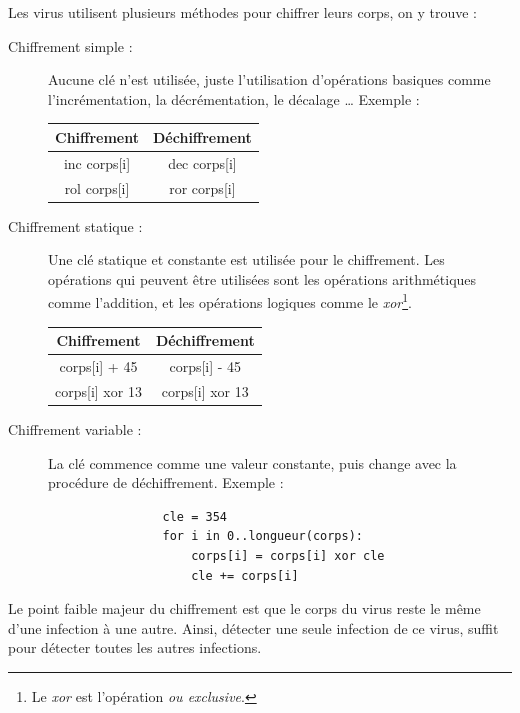     Les virus utilisent plusieurs méthodes pour chiffrer leurs corps, on y trouve : \cite{virus} %
    \begin{description}
        \item[Chiffrement simple :] Aucune clé n'est utilisée, juste l'utilisation d'opérations basiques comme
            l'incrémentation, la décrémentation, le décalage \ldots{} Exemple :
            \begin{center}
            \begin{tabular}{cc}
                \toprule
                Chiffrement & Déchiffrement \\
                \midrule
                inc corps[i] & dec corps[i] \\
                rol corps[i] & ror corps[i] \\
                \bottomrule
            \end{tabular}
            \end{center}

        \item[Chiffrement statique :] Une clé statique et constante est utilisée pour le chiffrement. Les opérations
            qui peuvent être utilisées sont les opérations arithmétiques comme l'addition, et les opérations logiques
            comme le \emph{xor}\footnote{Le \emph{xor} est l'opération \emph{ou exclusive}.}. %
            \begin{center}
            \begin{tabular}{cc}
                \toprule
                Chiffrement & Déchiffrement \\
                \midrule
                corps[i] + 45 & corps[i] - 45\\
                corps[i] xor 13 & corps[i] xor 13 \\
                \bottomrule
            \end{tabular}
            \end{center}

        \item[Chiffrement variable :] La clé commence comme une valeur constante, puis change avec 
            la procédure de déchiffrement. Exemple : %
            \begin{verbatim}
                cle = 354
                for i in 0..longueur(corps):
                    corps[i] = corps[i] xor cle
                    cle += corps[i]
            \end{verbatim}

    \end{description}
    Le point faible majeur du chiffrement est que le corps du virus reste le même d'une infection à une autre. Ainsi, 
    détecter une seule infection de ce virus, suffit pour détecter toutes les autres infections. \cite{virus} %

